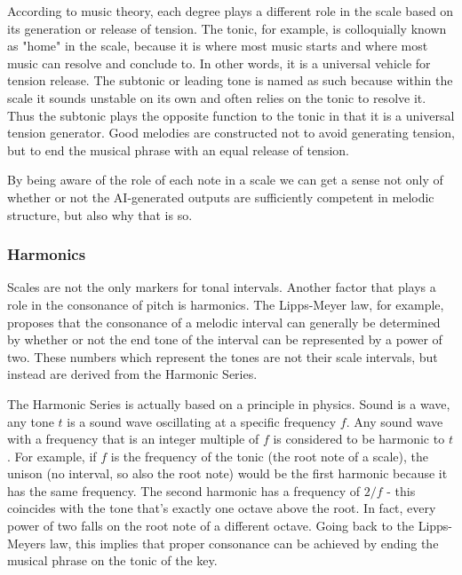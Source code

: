 According to music theory, each degree plays a different role in the scale based on its generation
or release of tension. The tonic, for example, is colloquially known as "home" in the scale,
because it is where most music starts and where most music can resolve and conclude to. In other
words, it is a universal vehicle for tension release. The subtonic or leading tone is named as
such because within the scale it sounds unstable on its own and often relies on the tonic to resolve
it. Thus the subtonic plays the opposite function to the tonic in that it is a universal tension
generator. Good melodies are constructed not to avoid generating tension, but to end the
musical phrase with an equal release of tension.

By being aware of the role of each note in a scale we can get a sense not only of whether or not
the AI-generated outputs are sufficiently competent in melodic structure, but also why that is so.

\subsubsection{Harmonics}

Scales are not the only markers for tonal intervals. Another factor that plays a role in the
consonance of pitch is harmonics. The Lipps-Meyer law, for example, proposes that the consonance
of a melodic interval can generally be determined by whether or not the end tone of the interval
can be represented by a power of two.\autocite{musiciansArithmetic} These numbers which represent
the tones are not their scale intervals, but instead are derived from the Harmonic Series.

The Harmonic Series is actually based on a principle in physics. Sound is a wave, any tone $ t $
is a sound wave oscillating at a specific frequency $ f $. Any sound wave with a frequency
that is an integer multiple of $ f $ is considered to be harmonic to $ t $.\autocite{intervals} For example,
if $ f $ is the frequency of the tonic (the root note of a scale), the unison (no interval,
so also the root note) would be the first harmonic because it has the same frequency. The second
harmonic has a frequency of $ 2/f $ - this coincides with the tone that's exactly one octave
above the root. In fact, every power of two falls on the root note of a different octave. Going
back to the Lipps-Meyers law, this implies that proper consonance can be achieved by ending the
musical phrase on the tonic of the key.

